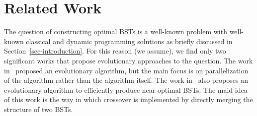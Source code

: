 
\section{Related Work}
\label{sec-relatedwork}

The question of constructing optimal BSTs is a well-known problem with well-known classical and dynamic programming solutions as briefly discussed in Section~\ref{sec-introduction}. For this reason (we assume), we find only two significant works that propose evolutionary approaches to the question. The work in~\cite{zamanifar2007designing} proposed an evolutionary algorithm, but the main focus is on parallelization of the algorithm rather than the algorithm itself. The work in~\cite{fatemi2007new} also proposes an evolutionary algorithm to efficiently produce near-optimal BSTs. The maid idea of this work is the way in which crossover is implemented by directly merging the structure of two BSTs.
